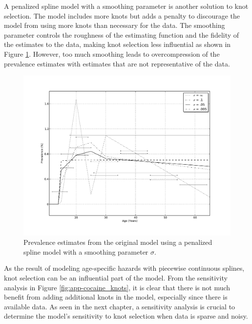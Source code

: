 A penalized spline model with a smoothing parameter is another
solution to knot selection.  The model includes more knots but adds a
penalty to discourage the model from using more knots than necessary
for the data.  The smoothing parameter controls the roughness of the
estimating function and the fidelity of the estimates to the data,
making knot selection less influential as shown in Figure
\ref{fig:app-cocaine_smoothing}.  However, too much smoothing leads
to overcompression of the prevalence estimates with
estimates that are not representative of the data.

    \begin{figure}[h]
        \begin{center}
            \includegraphics[width=\textwidth]{applications/cocaine_dependence-smoothing.pdf}
            \caption{Prevalence estimates from the original model
              using a penalized spline model with a smoothing
              parameter $\sigma$. }
        \label{fig:app-cocaine_smoothing}
        \end{center}
    \end{figure}

As the result of modeling age-specific hazards with piecewise
continuous splines, knot selection can be an influential part of the
model.  From the sensitivity analysis in Figure \ref{fig:app-cocaine_knots},
it is clear that there is not much benefit from adding additional
knots in the model, especially since there is available data.  As seen
in the next chapter, a sensitivity analysis is crucial to determine
the model's sensitivity to knot selection when data is sparse and noisy.
